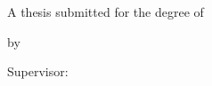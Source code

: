 \begin{titlepage}
  \centering
  \vspace*{1.5cm}
  {\LARGE\bfseries \thesistitle \par}
  \vspace{2cm}
  {\large A thesis submitted for the degree of \par}
  \vspace{0.3cm}
  {\Large \degree \par}
  \vspace{2cm}
  {\large by \par}
  \vspace{0.3cm}
  {\Large\bfseries \candidate \par}
  \vfill
  {\large Supervisor: \supervisor \par}
  \vspace{1.5cm}
  {\large \department \par}
  {\large \university \par}
  \vspace{0.5cm}
  {\large \submitted \par}
\end{titlepage}

